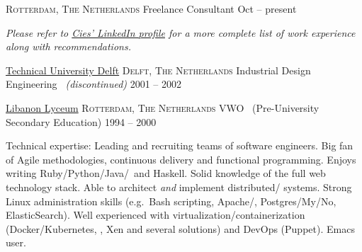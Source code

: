 \documentclass[10pt,a4paper]{article}
\begin{document}
    
    \spacedhrule{0em}{-0.4em}
    
    
    \headedsection
      {\href{http://cies.breijs.com}{}}
      {\textsc{Rotterdam, The Netherlands}} {%
      \headedsubsection
        {Freelance  Consultant}
        {Oct  -- present}
        {}
    }
    
    
    \vspace{-0.2em}
    \begin{center}
      \emph{\small Please refer to \href{http://www.linkedin.com/in/ciesbreijs}{Cies' LinkedIn profile} for a more complete list of work experience along with recommendations.}
    \end{center}
    
    
    \spacedhrule{-0.2em}{-0.4em}
    
    
    
    
    \headedsection
      {\href{http://www.tudelft.nl/en}{Technical University Delft}}
      {\textsc{Delft, The Netherlands}} {%
      \headedsubsection
        {Industrial Design Engineering \textnormal{\textit{~(discontinued)}}}
        {2001 -- 2002} {}
    }
    
    \headedsection
      {\href{http://www.libanonlyceum.nl}{Libanon Lyceum}}
      {\textsc{Rotterdam, The Netherlands}} {%
      \headedsubsection
        {VWO \textnormal{~(Pre-University Secondary Education)}}
        {1994 -- 2000} {}
    }
    
    
    \spacedhrule{0.5em}{-0.4em}
    
    
    \inlineheadsection  %
      {Technical expertise:}
      {Leading and recruiting teams of software engineers.  Big fan of Agile methodologies, continuous delivery and functional programming.  Enjoys writing Ruby/\nsp Python/\nsp Java/\nsp \CPP~and Haskell.  Solid knowledge of the full web technology stack.  Able to architect \textit{and} implement distributed/ systems.  Strong Linux administration skills (e.g.\ Bash scripting, Apache/, Postgres/My/No, ElasticSearch).  Well experienced with virtualization/containerization (Docker/Kubernetes, , Xen and several  solutions) and DevOps (Puppet).  Emacs user.}
    
\end{document}
